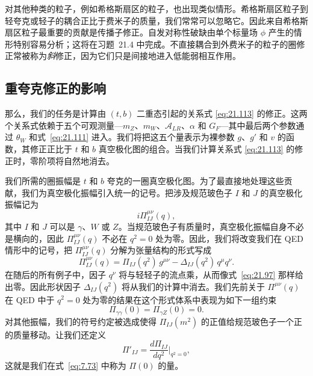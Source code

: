 对其他种类的粒子，例如希格斯扇区的粒子，也出现类似情形。希格斯扇区粒子到轻夸克或轻子的耦合正比于费米子的质量，我们常常可以忽略它。因此来自希格斯扇区粒子最重要的贡献是传播子修正。自发对称性破缺由单个标量场 $\phi$ 产生的情形特别容易分析；这将在习题~21.4 中完成。不直接耦合到外费米子的粒子的圈修正常被称为\emph{斜}修正，因为它们只是间接地进入低能弱相互作用。

\subsection{重夸克修正的影响}

那么，我们的任务是计算由 $(t, b)$ 二重态引起的关系式 \eqref{eq:21.113} 的修正。这两个关系式依赖于五个可观测量---$m_Z$、$m_W$、$\mathcal{A}_{LR}$、$\alpha$ 和 $G_F$---其中最后两个参数通过 $\theta_W$ 和式~\eqref{eq:21.111} 进入。我们将把这五个量表示为裸参数 $g$、$g'$ 和 $v$ 的函数，其修正正比于 $t$ 和 $b$ 真空极化图的组合。当我们计算关系式 \eqref{eq:21.113} 的修正时，零阶项将自然地消去。

我们所需的圈振幅是 $t$ 和 $b$ 夸克的一圈真空极化图。为了最直接地处理这些贡献，我们为真空极化振幅引入统一的记号。把涉及规范玻色子 $I$ 和 $J$ 的真空极化振幅记为
\begin{equation}
  i\Pi^{\mu\nu}_{IJ}(q) ,
  \label{eq:21.114}
\end{equation}
其中 $I$ 和 $J$ 可以是 $\gamma$、$W$ 或 $Z$。当规范玻色子有质量时，真空极化振幅自身不必是横向的，因此 $\Pi^{\mu\nu}_{IJ}(q)$ 不必在 $q^2 = 0$ 处为零。因此，我们将改变我们在 QED 情形中的记号，把 $\Pi^{\mu\nu}_{IJ}(q)$ 分解为张量结构的形式写成
\begin{equation}
  \Pi^{\mu\nu}_{IJ}(q) = \Pi_{IJ}(q^2)\,g^{\mu\nu} - \Delta_{IJ}(q^2)\,q^\mu q^\nu
  .
  \label{eq:21.115}
\end{equation}
在随后的所有例子中，因子 $q^\nu$ 将与轻轻子的流点乘，从而像式~\eqref{eq:21.97} 那样给出零。因此形状因子 $\Delta_{IJ}(q^2)$ 将从我们的计算中消去。我们先前关于 $\Pi^{\mu\nu}(q)$ 在 QED 中于 $q^2 = 0$ 处为零的结果在这个形式体系中表现为如下一组约束
\begin{equation}
  \Pi_{\gamma\gamma}(0) = \Pi_{\gamma Z}(0) = 0 .
  \label{eq:21.116}
\end{equation}
对其他振幅，我们的符号约定被选成使得 $\Pi_{IJ}(m^2)$ 的正值给规范玻色子一个正的质量移动。让我们还定义
\begin{equation}
  \Pi'_{IJ} = \frac{d\Pi_{IJ}}{dq^2}\Big|_{q^2=0},
  \label{eq:21.117}
\end{equation}
这就是我们在式~\eqref{eq:7.73} 中称为 $\Pi(0)$ 的量。

